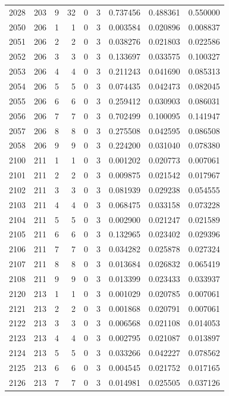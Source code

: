 \begin{longtable}{rrrrrrrrr}
2028 & 203 & 9 & 32 & 0 & 3 & 0.737456 & 0.488361 & 0.550000 \\
2050 & 206 & 1 & 1 & 0 & 3 & 0.003584 & 0.020896 & 0.008837 \\
2051 & 206 & 2 & 2 & 0 & 3 & 0.038276 & 0.021803 & 0.022586 \\
2052 & 206 & 3 & 3 & 0 & 3 & 0.133697 & 0.033575 & 0.100327 \\
2053 & 206 & 4 & 4 & 0 & 3 & 0.211243 & 0.041690 & 0.085313 \\
2054 & 206 & 5 & 5 & 0 & 3 & 0.074435 & 0.042473 & 0.082045 \\
2055 & 206 & 6 & 6 & 0 & 3 & 0.259412 & 0.030903 & 0.086031 \\
2056 & 206 & 7 & 7 & 0 & 3 & 0.702499 & 0.100095 & 0.141947 \\
2057 & 206 & 8 & 8 & 0 & 3 & 0.275508 & 0.042595 & 0.086508 \\
2058 & 206 & 9 & 9 & 0 & 3 & 0.224200 & 0.031040 & 0.078380 \\
2100 & 211 & 1 & 1 & 0 & 3 & 0.001202 & 0.020773 & 0.007061 \\
2101 & 211 & 2 & 2 & 0 & 3 & 0.009875 & 0.021542 & 0.017967 \\
2102 & 211 & 3 & 3 & 0 & 3 & 0.081939 & 0.029238 & 0.054555 \\
2103 & 211 & 4 & 4 & 0 & 3 & 0.068475 & 0.033158 & 0.073228 \\
2104 & 211 & 5 & 5 & 0 & 3 & 0.002900 & 0.021247 & 0.021589 \\
2105 & 211 & 6 & 6 & 0 & 3 & 0.132965 & 0.023402 & 0.029396 \\
2106 & 211 & 7 & 7 & 0 & 3 & 0.034282 & 0.025878 & 0.027324 \\
2107 & 211 & 8 & 8 & 0 & 3 & 0.013684 & 0.026832 & 0.065419 \\
2108 & 211 & 9 & 9 & 0 & 3 & 0.013399 & 0.023433 & 0.033937 \\
2120 & 213 & 1 & 1 & 0 & 3 & 0.001029 & 0.020785 & 0.007061 \\
2121 & 213 & 2 & 2 & 0 & 3 & 0.001868 & 0.020791 & 0.007061 \\
2122 & 213 & 3 & 3 & 0 & 3 & 0.006568 & 0.021108 & 0.014053 \\
2123 & 213 & 4 & 4 & 0 & 3 & 0.002795 & 0.021087 & 0.013897 \\
2124 & 213 & 5 & 5 & 0 & 3 & 0.033266 & 0.042227 & 0.078562 \\
2125 & 213 & 6 & 6 & 0 & 3 & 0.004545 & 0.021752 & 0.017165 \\
2126 & 213 & 7 & 7 & 0 & 3 & 0.014981 & 0.025505 & 0.037126 \\

\end{longtable}
